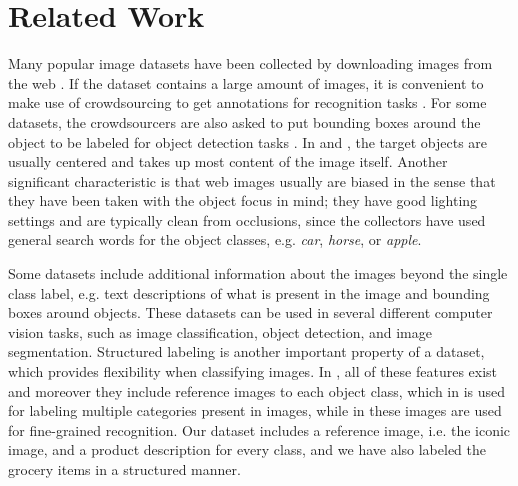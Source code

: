 \section{Related Work}\label{paperA:sec:related-work}

Many popular image datasets have been collected by downloading images from the web . 
If the dataset contains a large amount of images, it is convenient to make use of crowdsourcing to get annotations for recognition tasks . For some datasets, the crowdsourcers are also asked to put bounding boxes around the object to be labeled for object detection tasks . In  and , the target objects are usually centered and takes up most content of the image itself. Another significant characteristic is that web images usually are biased in the sense that they have been taken with the object focus in mind; they have good lighting settings and are typically clean from occlusions, since the collectors have used general search words for the object classes, e.g. \textit{car}, \textit{horse}, or \textit{apple}.

Some datasets include additional information about the images beyond the single class label, e.g. text descriptions of what is present in the image and bounding boxes around objects. These datasets can be used in several different computer vision tasks, such as image classification, object detection, and image segmentation. Structured labeling is another important property of a dataset, which provides flexibility when classifying images. In  , all of these features exist and moreover they include reference images to each object class, which in  is used for labeling multiple  categories present in images, while in  these images are used for fine-grained recognition. 
Our dataset includes a reference image, i.e. the iconic image, and a product description for every class, and we have also labeled the grocery items in a structured manner.

